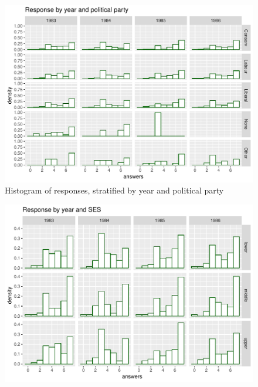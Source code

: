 \documentclass[11pt,letter]{article}\usepackage[]{graphicx}\usepackage[]{color}
\makeatletter
\def\maxwidth{ %
  \ifdim\Gin@nat@width>\linewidth
    \linewidth
  \else
    \Gin@nat@width
  \fi
}
\newenvironment{knitrout}{}{} %
\makeatother
\begin{document}
\begin{knitrout}
\color{fgcolor}\begin{figure}[H]

{\centering \includegraphics[width=\maxwidth]{figure/figure-3-1} 

}

\caption[Histogram of responses, stratified by year and political party]{Histogram of responses, stratified by year and political party}\label{fig:figure-31}
\end{figure}

\begin{figure}[H]

{\centering \includegraphics[width=\maxwidth]{figure/figure-3-2} 

}
\end{figure}
\end{knitrout}
\end{document}
